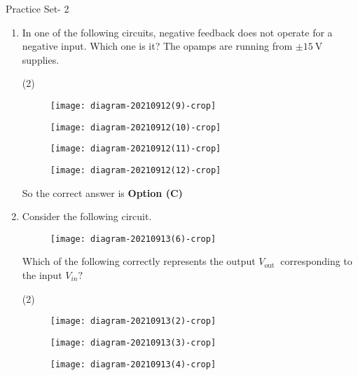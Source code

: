 \newpage
\begin{abox}
	Practice Set- 2
\end{abox}
\begin{enumerate}
	\item In one of the following circuits, negative feedback does not operate for a negative input. Which one is it? The opamps are running from $\pm 15 \mathrm{~V}$ supplies.
	{}
\begin{tasks}(2)
\task[\textbf{A.}] \begin{figure}[H]
	\centering
	\texttt{[image: diagram-20210912(9)-crop]}
\end{figure}
\task[\textbf{B.}] \begin{figure}[H]
	\centering
	\texttt{[image: diagram-20210912(10)-crop]}
\end{figure}
\task[\textbf{C.}] \begin{figure}[H]
	\centering
	\texttt{[image: diagram-20210912(11)-crop]}
\end{figure}
\task[\textbf{D.}] \begin{figure}[H]
	\centering
	\texttt{[image: diagram-20210912(12)-crop]}
\end{figure}
\end{tasks}
\begin{answer}
So the correct answer is \textbf{Option (C)}
\end{answer}
	\item Consider the following circuit.\\
	\begin{figure}[H]
		\centering
		\texttt{[image: diagram-20210913(6)-crop]}
	\end{figure}
	Which of the following correctly represents the output $V_{\text {out }}$ corresponding to the input $V_{i n} ?$
	{}
\begin{tasks}(2)
\task[\textbf{A.}] \begin{figure}[H]
	\centering
	\texttt{[image: diagram-20210913(2)-crop]}
\end{figure}
\task[\textbf{B.}] \begin{figure}[H]
	\centering
	\texttt{[image: diagram-20210913(3)-crop]}
\end{figure}
\task[\textbf{C.}]\begin{figure}[H]
	\centering
	\texttt{[image: diagram-20210913(4)-crop]}

\end{figure}
\end{tasks}
\end{enumerate}
